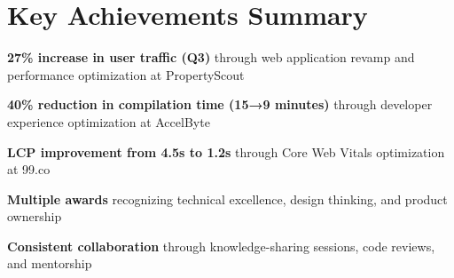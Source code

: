 \documentclass[a4paper, 11pt]{article}
\newcommand{\resumeSubHeadingListStart}{\begin{itemize}[leftmargin=0.1in, label={}]}
\newcommand{\resumeSubHeadingListEnd}{\end{itemize}\vspace{5pt}}
\begin{document}
\section{Key Achievements Summary}
    \resumeSubHeadingListStart
        \small{
            \item \textbf{27\% increase in user traffic (Q3)} through web application revamp and performance optimization at PropertyScout
            \item \textbf{40\% reduction in compilation time (15→9 minutes)} through developer experience optimization at AccelByte
            \item \textbf{LCP improvement from 4.5s to 1.2s} through Core Web Vitals optimization at 99.co
            \item \textbf{Multiple awards} recognizing technical excellence, design thinking, and product ownership
            \item \textbf{Consistent collaboration} through knowledge-sharing sessions, code reviews, and mentorship
        }
    \resumeSubHeadingListEnd
\end{document}
